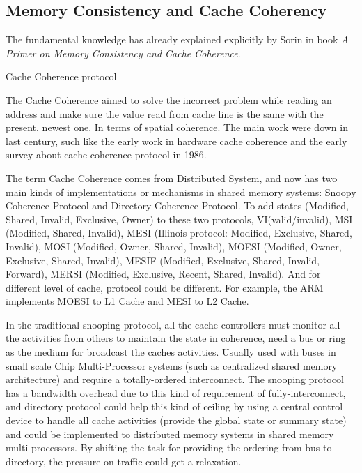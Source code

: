 \subsection{Memory Consistency and Cache Coherency}
\par The fundamental knowledge has already explained explicitly by Sorin in book \textit{A Primer on Memory Consistency and Cache Coherence}\cite{sorin2011primer}. 
\par Cache Coherence protocol 
\par The Cache Coherence aimed to solve the incorrect problem while reading an address and make sure the value read from cache line is the same with the present, newest one. In terms of spatial coherence. The main work were down in last century, such like the early work in hardware cache coherence\cite{goodman1983using}\cite{papamarcos1998low}\cite{wilson1987hierarchical} and the early survey about cache coherence protocol\cite{archibald1986cache} in 1986. 
\par The term Cache Coherence comes from Distributed System, and now has two main kinds of implementations or mechanisms in shared memory systems: Snoopy Coherence Protocol and Directory Coherence Protocol. To add states (Modified, Shared, Invalid, Exclusive, Owner) to these two protocols, VI(valid/invalid), MSI (Modified, Shared, Invalid), MESI (Illinois protocol: Modified, Exclusive, Shared, Invalid), MOSI (Modified, Owner, Shared, Invalid), MOESI (Modified, Owner, Exclusive, Shared, Invalid), MESIF (Modified, Exclusive, Shared, Invalid, Forward), MERSI (Modified, Exclusive, Recent, Shared, Invalid). And for different level of cache, protocol could be different. For example, the ARM implements MOESI to L1 Cache and MESI to L2 Cache\cite{ARMA57TRM}. 
\par In the traditional snooping protocol, all the cache controllers must monitor all the activities from others to maintain the state in coherence, need a bus or ring as the medium for broadcast the caches activities. Usually used with buses in small scale Chip Multi-Processor systems (such as centralized shared memory architecture\cite{hennessy2017computer}) and require a totally-ordered interconnect\cite{martin2003token}\cite{sorin2011primer}. The snooping protocol has a bandwidth overhead due to this kind of requirement of fully-interconnect\cite{zebchuk2009tagless}, and directory protocol could help this kind of ceiling by using a central control device to handle all cache activities (provide the global state or summary state) and could be implemented to distributed memory systems in shared memory multi-processors\cite{hennessy2017computer}. By shifting the task for providing the ordering from bus to directory, the pressure on traffic could get a relaxation.
